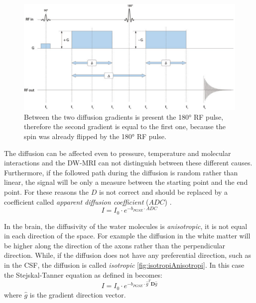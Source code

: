  \begin{figure}[h]
    \centering
    \begin{minipage}[c]{0.70\textwidth}
      \includegraphics[width=\textwidth]{images/PGSE.png}
    \end{minipage}\hfill
    \begin{minipage}[c]{0.25\textwidth}
      \caption{Between the two diffusion gradients is present the 180° RF pulse, therefore the second gradient is equal to the first one, because the spin was already flipped by the 180° RF pulse. \cite{elementiRisonanza}}
    \label{fig:PGSE}
    \end{minipage}
 \end{figure}

 The diffusion can be affected even to pressure, temperature and molecular interactions and the DW-MRI can not distinguish between these different causes. Furthermore, if the followed path during the diffusion is random rather than linear, the signal will be only a measure between the starting point and the end point. For these reasons the $D$ is not correct and should be replaced by a coefficient called \emph{apparent diffusion coefficient} ($ADC$) \cite{elementiRisonanza}.
 \begin{equation}
    I = I_0 \cdot e^{-b_{PGSE} \cdot ADC}
 \end{equation}

 In the brain, the diffusivity of the water molecules is \emph{anisotropic}, it is not equal in each direction of the space. For example the diffusion in the white matter will be higher along the direction of the axons rather than the perpendicular direction. While, if the diffusion does not have any preferential direction, such as in the CSF, the diffusion is called \emph{isotropic} \ref{fig:isotropiAnisotropi}. In this case the Stejskal-Tanner equation as defined in \cite{dtiBook} becomes:
 \begin{equation}
    I = I_0 \cdot e^{-b_{PGSE} \cdot \hat{g}^T\mathbf{D}\hat{g}}
 \end{equation}
 where $\hat{g}$ is the gradient direction vector.

